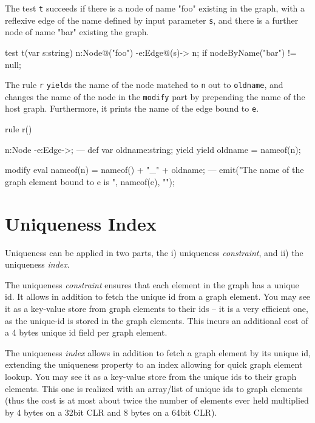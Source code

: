 \begin{example}
The test \texttt{t} succeeds if there is a node of name "foo" existing in the graph, with a reflexive edge of the name defined by input parameter \texttt{s}, and there is a further node of name "bar" existing the graph.

\begin{grgen}
test t(var s:string) {
  n:Node{@("foo")} -e:Edge{@(s)}-> n;
  if{ nodeByName("bar") != null; }
}
\end{grgen}

The rule \texttt{r} \texttt{yield}s the name of the node matched to \texttt{n} out to \texttt{oldname}, and changes the name of the node in the \texttt{modify} part by prepending the name of the host graph. Furthermore, it prints the name of the edge bound to \texttt{e}.

\begin{grgen}
rule r() {
  n:Node -e:Edge->;
---
  def var oldname:string;
  yield { yield oldname = nameof(n); }
		
  modify {
    eval {
      nameof(n) = nameof() + "_" + oldname;
    }
  ---
    emit("The name of the graph element bound to e is ", nameof(e), "\n");
  }
}
\end{grgen}

\end{example}


\section{Uniqueness Index}\label{sec:uniqueness}
Uniqueness can be applied in two parts, the i) uniqueness \emph{constraint}, and ii) the uniqueness \emph{index}.

The uniqueness \emph{constraint} ensures that each element in the graph has a unique id. 
It allows in addition to fetch the unique id from a graph element.
You may see it as a key-value store from graph elements to their ids -- it is a very efficient one, as the unique-id is stored in the graph elements. 
This incurs an additional cost of a 4 bytes unique id field per graph element.

The uniqueness \emph{index} allows in addition to fetch a graph element by its unique id, extending the uniqueness property to an index allowing for quick graph element lookup.
You may see it as a key-value store from the unique ids to their graph elements.
This one is realized with an array/list of unique ids to graph elements (thus the cost is at most about twice the number of elements ever held multiplied by 4 bytes on a 32bit CLR and 8 bytes on a 64bit CLR).

